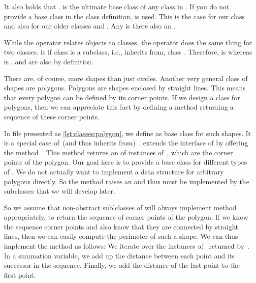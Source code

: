 It also holds that .
 is the ultimate base class of any class in \python{}.
If you do not provide a base class in the class definition,  is used.
This is the case for our class  and also for our older classes  and .
Any  is there also an .

While the operator  relates objects to classes, the operator  does the same thing for two classes.
 is  if class  is a subclass, i.e., inherits from, class .
Therefore,  is  whereas  is .
 and  are also  by definition.

There are, of course, more shapes than just circles.
Another very general class of shapes are polygons.
Polygons are shapes enclosed by straight lines.
This means that every polygon can be defined by its corner points.
If we design a class for polygons, then we can appreciate this fact by defining a method  returning a sequence of these corner points.

%
%
%
In file  presented as \cref{lst:classes:polygon}, we define  as base class for such shapes.
It is a special case of~(and thus inherits from)~.
 extends the interface of  by offering the method~.
This method returns an  of instances of~, which are the corner points of the polygon.
Our goal here is to provide a base class for different types of .
We do not actually want to implement a data structure for arbitrary polygons directly.
So the method  raises an  and thus must be implemented by the subclasses that we will develop later.

So we assume that non-abstract sublclasses of  will always implement method  appropriately, to return the sequence of corner points of the polygon.
If we know the sequence corner points and also know that they are connected by straight lines, then we can easily compute the perimeter of such a shape.
We can thus implement the method  as follows:
We iterate over the instances of~ returned by~.
In a summation variable, we add up the distance between each point and its successor in the sequence.
Finally, we add the distance of the last point to the first point.

